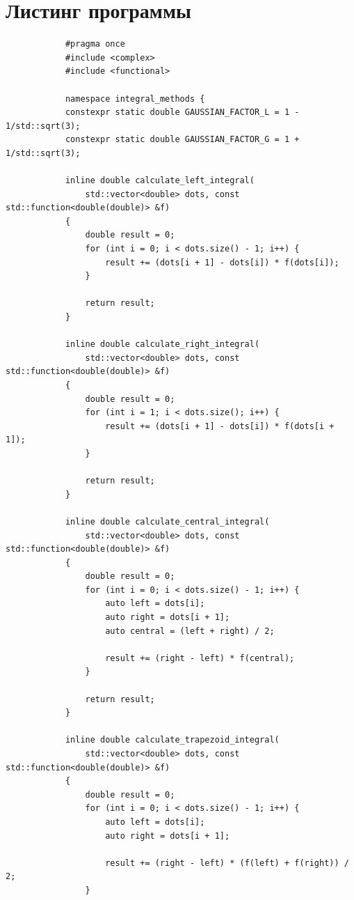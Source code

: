 \documentclass[a4paper, 14pt]{extarticle}
\begin{document}
    \section{Листинг программы}
    {\small
        \begin{verbatim}
            #pragma once
            #include <complex>
            #include <functional>

            namespace integral_methods {
            constexpr static double GAUSSIAN_FACTOR_L = 1 - 1/std::sqrt(3);
            constexpr static double GAUSSIAN_FACTOR_G = 1 + 1/std::sqrt(3);

            inline double calculate_left_integral(
                std::vector<double> dots, const std::function<double(double)> &f)
            {
                double result = 0;
                for (int i = 0; i < dots.size() - 1; i++) {
                    result += (dots[i + 1] - dots[i]) * f(dots[i]);
                }

                return result;
            }

            inline double calculate_right_integral(
                std::vector<double> dots, const std::function<double(double)> &f)
            {
                double result = 0;
                for (int i = 1; i < dots.size(); i++) {
                    result += (dots[i + 1] - dots[i]) * f(dots[i + 1]);
                }

                return result;
            }

            inline double calculate_central_integral(
                std::vector<double> dots, const std::function<double(double)> &f)
            {
                double result = 0;
                for (int i = 0; i < dots.size() - 1; i++) {
                    auto left = dots[i];
                    auto right = dots[i + 1];
                    auto central = (left + right) / 2;

                    result += (right - left) * f(central);
                }

                return result;
            }

            inline double calculate_trapezoid_integral(
                std::vector<double> dots, const std::function<double(double)> &f)
            {
                double result = 0;
                for (int i = 0; i < dots.size() - 1; i++) {
                    auto left = dots[i];
                    auto right = dots[i + 1];

                    result += (right - left) * (f(left) + f(right)) / 2;
                }


\end{verbatim}}
\end{document}
